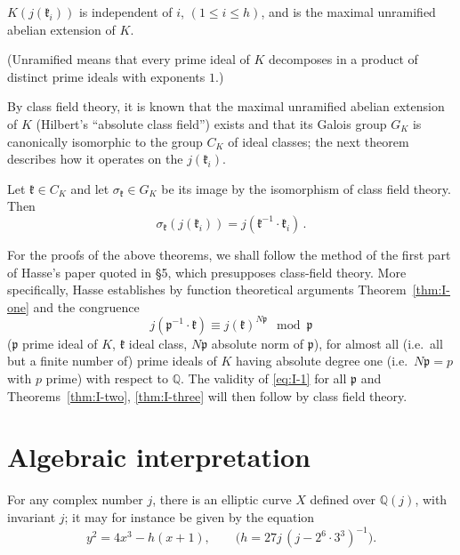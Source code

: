 \begin{theorem}\label{thm:I-two}
$K(j(\mathfrak{k}_{i}))$ is independent of $i$, $(1\leq i\leq h)$, and is
the maximal unramified abelian extension of $K$.
\end{theorem}

\noindent(Unramified means that every prime ideal of $K$ decomposes in a
product of distinct prime ideals with exponents $1$.)

By class field theory, it is known that the maximal unramified abelian
extension of $K$ (Hilbert's ``absolute class field'') exists and that its
Galois group $G_{K}$ is canonically isomorphic to the group $C_{K}$ of
ideal classes; the next theorem describes how it operates on the
$j(\mathfrak{k}_{i})$.

\begin{theorem}\label{thm:I-three}
Let $\mathfrak{k}\in C_{K}$ and let $\sigma_{\mathfrak{k}}\in G_{K}$ be
its image by the isomorphism of class field theory. Then
\[
\sigma_{\mathfrak{k}}(j(\mathfrak{k}_{i}))
   =j(\mathfrak{k}^{-1}\cdot\mathfrak{k}_{i})\,.
\]
\end{theorem}

For the proofs of the above theorems, we shall follow the method of the
first part of Hasse's paper quoted in §5, which presupposes class-field
theory. More specifically, Hasse establishes by function theoretical
arguments Theorem~\ref{thm:I-one} and the congruence
\[
j(\mathfrak{p}^{-1}\cdot\mathfrak{k})
   \equiv j(\mathfrak{k})^{N\mathfrak{p}}\mod \mathfrak{p}
\tag{1}\label{eq:I-1}
\]
($\mathfrak{p}$ prime ideal of $K$, $\mathfrak{k}$ ideal class,
$N\mathfrak{p}$ absolute norm of $\mathfrak{p}$), for almost all
(i.e.\ all but a finite number of) prime ideals of $K$ having absolute
degree one (i.e.\ $N\mathfrak{p}=p$ with $p$ prime) with respect to
$\mathbb{Q}$. The validity of \eqref{eq:I-1} for all $\mathfrak{p}$ and
Theorems~\ref{thm:I-two}, \ref{thm:I-three} will then follow by class
field theory.

\section{Algebraic interpretation}

For any complex number $j$, there is an elliptic curve $X$ defined over
$\mathbb{Q}(j)$, with invariant $j$; it may for instance be given by the
equation
\[
y^{2}=4x^{3}-h(x+1),\qquad\bigl(h=27j\,(j-2^{6}\!\cdot 3^{3})^{-1}\bigr).
\]

